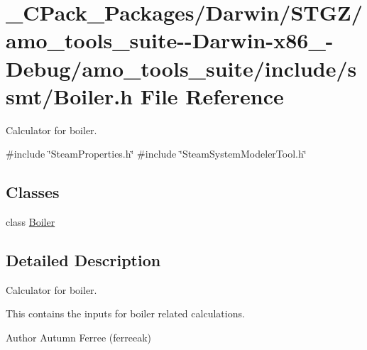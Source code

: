 \hypertarget{___c_pack___packages_2_darwin_2_s_t_g_z_2amo__tools__suite--_darwin-x86__64-_debug_2amo__tools__7b788f9ca0770ad621a2356b855bf0c2}{}\section{\+\_\+\+C\+Pack\+\_\+\+Packages/\+Darwin/\+S\+T\+G\+Z/amo\+\_\+tools\+\_\+suite-\/-\/\+Darwin-\/x86\+\_-\/\+Debug/amo\+\_\+tools\+\_\+suite/include/ssmt/\+Boiler.h File Reference}
\label{___c_pack___packages_2_darwin_2_s_t_g_z_2amo__tools__suite--_darwin-x86__64-_debug_2amo__tools__7b788f9ca0770ad621a2356b855bf0c2}


Calculator for boiler.  


{\ttfamily \#include \char`\"{}Steam\+Properties.\+h\char`\"{}}\newline
{\ttfamily \#include \char`\"{}Steam\+System\+Modeler\+Tool.\+h\char`\"{}}\newline
\subsection*{Classes}
\begin{DoxyCompactItemize}
\item 
class \hyperlink{class_boiler}{Boiler}
\end{DoxyCompactItemize}


\subsection{Detailed Description}
Calculator for boiler. 

This contains the inputs for boiler related calculations.

\begin{DoxyAuthor}{Author}
Autumn Ferree (ferreeak) 
\end{DoxyAuthor}
